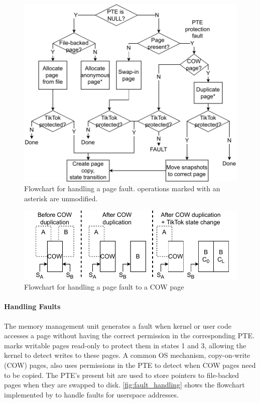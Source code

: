 \documentclass[letterpaper,twocolumn,10pt, anonymous]{article}
\begin{document}
\begin{figure}[h]
  \includegraphics[width=\linewidth]{img/pagefault.pdf}
  \caption{Flowchart for handling a page fault. operations
           marked with an asterisk are unmodified.}
  \label{fig:fault_handling}
\end{figure}

\begin{figure}[h]
  \includegraphics[width=\linewidth]{img/pagefault_cow.pdf}
  \caption{Flowchart for handling a page fault to a COW page}
  \label{fig:fault_handling_cow}
\end{figure}

\paragraph{Handling Faults}
The memory management unit generates a fault when kernel or user code accesses
a page without having the correct permission in the corresponding PTE.
\tiktok marks writable pages read-only to protect them in 
states 1 and 3, allowing the kernel to detect writes to these pages.
A common OS mechanism, copy-on-write (COW) pages, also uses 
permissions in the PTE to detect when COW pages need to be copied.
The PTE's present bit are used to store pointers to file-backed pages
when they are swapped to disk.
\autoref{fig:fault_handling} shows the flowchart implemented by
 to handle faults for userspace addresses.
\end{document}
